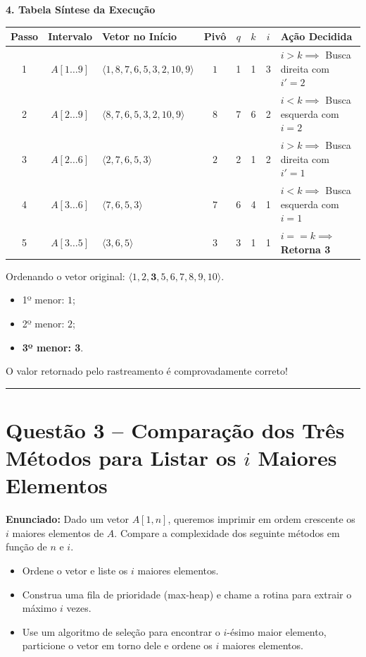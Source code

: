 \documentclass[11pt,a4paper]{article}
\newcommand{\topico}[1]{\par\medskip\textbf{\color{azul}#1}\par}
\newcommand{\questao}[2]{\section*{Questão #1 -- #2}}
\newcommand{\destaque}[1]{\textbf{\color{azul}#1}}
\begin{document}
\topico{4. Tabela Síntese da Execução}
\begin{center}
\small
\setlength{\tabcolsep}{4pt}
\begin{tabular}{cclccccp{5.5cm}}
\toprule
\textbf{Passo} & \textbf{Intervalo} & \textbf{Vetor no Início} & \textbf{Pivô} & $q$ & $k$ & $i$ & \textbf{Ação Decidida} \\ \midrule
1 & $A[1 \dots 9]$ & $\langle 1, 8, 7, 6, 5, 3, 2, 10, 9 \rangle$ & $1$ & 1 & 1 & 3 & $i > k \implies$ Busca direita com $i'=2$ \\
2 & $A[2 \dots 9]$ & $\langle 8, 7, 6, 5, 3, 2, 10, 9 \rangle$ & $8$ & 7 & 6 & 2 & $i < k \implies$ Busca esquerda com $i=2$ \\
3 & $A[2 \dots 6]$ & $\langle 2, 7, 6, 5, 3 \rangle$ & $2$ & 2 & 1 & 2 & $i > k \implies$ Busca direita com $i'=1$ \\
4 & $A[3 \dots 6]$ & $\langle 7, 6, 5, 3 \rangle$ & $7$ & 6 & 4 & 1 & $i < k \implies$ Busca esquerda com $i=1$ \\
5 & $A[3 \dots 5]$ & $\langle 3, 6, 5 \rangle$ & $3$ & 3 & 1 & 1 & $i == k \implies$ \textbf{Retorna 3} \\
\bottomrule
\end{tabular}
\end{center}

\begin{caixaEstudo}
Ordenando o vetor original: $\langle 1, 2, \mathbf{3}, 5, 6, 7, 8, 9, 10 \rangle$.
\begin{itemize}
    \item 1º menor: $1$;
    \item 2º menor: $2$;
    \item \destaque{3º menor: 3}.
\end{itemize}
O valor retornado pelo rastreamento é comprovadamente correto!
\end{caixaEstudo}

\vspace{10pt}
\hrule
\vspace{6pt}

\questao{3}{Comparação dos Três Métodos para Listar os $i$ Maiores Elementos}

\textbf{Enunciado:} Dado um vetor $A[1, n]$, queremos imprimir em ordem crescente os $i$ maiores elementos de $A$. Compare a complexidade dos seguinte métodos em função de $n$ e $i$.
\begin{itemize}
    \item[(a)] Ordene o vetor e liste os $i$ maiores elementos.
    \item[(b)] Construa uma fila de prioridade (max-heap) e chame a rotina para extrair o máximo $i$ vezes.
    \item[(c)] Use um algoritmo de seleção para encontrar o $i$-ésimo maior elemento, particione o vetor em torno dele e ordene os $i$ maiores elementos.
\end{itemize}
\end{document}
